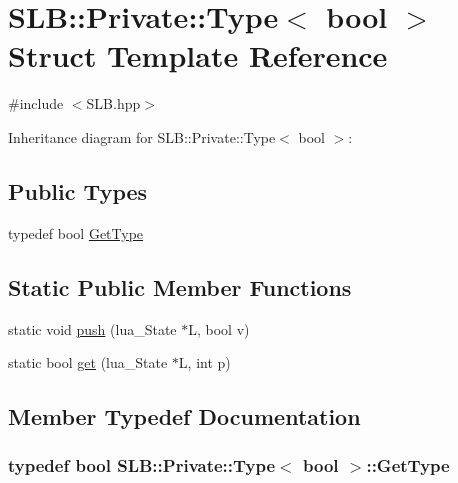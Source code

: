 \hypertarget{structSLB_1_1Private_1_1Type_3_01bool_01_4}{}\section{S\+LB\+:\+:Private\+:\+:Type$<$ bool $>$ Struct Template Reference}
\label{structSLB_1_1Private_1_1Type_3_01bool_01_4}


{\ttfamily \#include $<$S\+L\+B.\+hpp$>$}



Inheritance diagram for S\+LB\+:\+:Private\+:\+:Type$<$ bool $>$\+:
\subsection*{Public Types}
\begin{DoxyCompactItemize}
\item 
typedef bool \hyperlink{structSLB_1_1Private_1_1Type_3_01bool_01_4_a5150ec44b7d1ca1b0e7496379941c64e}{Get\+Type}
\end{DoxyCompactItemize}
\subsection*{Static Public Member Functions}
\begin{DoxyCompactItemize}
\item 
static void \hyperlink{structSLB_1_1Private_1_1Type_3_01bool_01_4_a7f2440619ffc8dee04e6b5e0480d9b09}{push} (lua\+\_\+\+State $\ast$L, bool v)
\item 
static bool \hyperlink{structSLB_1_1Private_1_1Type_3_01bool_01_4_ac4d60c39d8f8fc8fab337fcd1d0a5fa3}{get} (lua\+\_\+\+State $\ast$L, int p)
\end{DoxyCompactItemize}


\subsection{Member Typedef Documentation}
\subsubsection[{\texorpdfstring{Get\+Type}{GetType}}]{\setlength{\rightskip}{0pt plus 5cm}typedef bool {\bf S\+L\+B\+::\+Private\+::\+Type}$<$ bool $>$\+::{\bf Get\+Type}}\hypertarget{structSLB_1_1Private_1_1Type_3_01bool_01_4_a5150ec44b7d1ca1b0e7496379941c64e}{}\label{structSLB_1_1Private_1_1Type_3_01bool_01_4_a5150ec44b7d1ca1b0e7496379941c64e}


